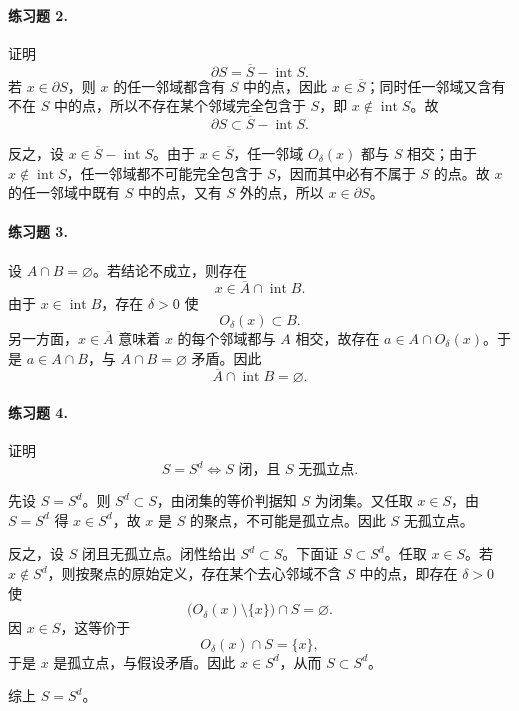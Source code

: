 \paragraph{练习题 2.}
\begin{xsolution}
证明
\[
  \partial S=\overline S-\operatorname{int}S.
\]
若 $x\in\partial S$，则 $x$ 的任一邻域都含有 $S$ 中的点，因此 $x\in\overline S$；同时任一邻域又含有不在 $S$ 中的点，所以不存在某个邻域完全包含于 $S$，即 $x\notin\operatorname{int}S$。故
\[
  \partial S\subset\overline S-\operatorname{int}S.
\]

反之，设 $x\in\overline S-\operatorname{int}S$。由于 $x\in\overline S$，任一邻域 $O_\delta(x)$ 都与 $S$ 相交；由于 $x\notin\operatorname{int}S$，任一邻域都不可能完全包含于 $S$，因而其中必有不属于 $S$ 的点。故 $x$ 的任一邻域中既有 $S$ 中的点，又有 $S$ 外的点，所以 $x\in\partial S$。
\end{xsolution}

\paragraph{练习题 3.}
\begin{xsolution}
设 $A\cap B=\varnothing$。若结论不成立，则存在
\[
  x\in\overline A\cap\operatorname{int}B.
\]
由于 $x\in\operatorname{int}B$，存在 $\delta>0$ 使
\[
  O_\delta(x)\subset B.
\]
另一方面，$x\in\overline A$ 意味着 $x$ 的每个邻域都与 $A$ 相交，故存在 $a\in A\cap O_\delta(x)$。于是 $a\in A\cap B$，与 $A\cap B=\varnothing$ 矛盾。因此
\[
  \overline A\cap\operatorname{int}B=\varnothing.
\]
\end{xsolution}

\paragraph{练习题 4.}
\begin{xsolution}
证明
\[
  S=S^d\Longleftrightarrow S\text{ 闭，且 }S\text{ 无孤立点}.
\]

先设 $S=S^d$。则 $S^d\subset S$，由闭集的等价判据知 $S$ 为闭集。又任取 $x\in S$，由 $S=S^d$ 得 $x\in S^d$，故 $x$ 是 $S$ 的聚点，不可能是孤立点。因此 $S$ 无孤立点。

反之，设 $S$ 闭且无孤立点。闭性给出 $S^d\subset S$。下面证 $S\subset S^d$。任取 $x\in S$。若 $x\notin S^d$，则按聚点的原始定义，存在某个去心邻域不含 $S$ 中的点，即存在 $\delta>0$ 使
\[
  \bigl(O_\delta(x)\setminus\{x\}\bigr)\cap S=\varnothing.
\]
因 $x\in S$，这等价于
\[
  O_\delta(x)\cap S=\{x\},
\]
于是 $x$ 是孤立点，与假设矛盾。因此 $x\in S^d$，从而 $S\subset S^d$。

综上 $S=S^d$。
\end{xsolution}

